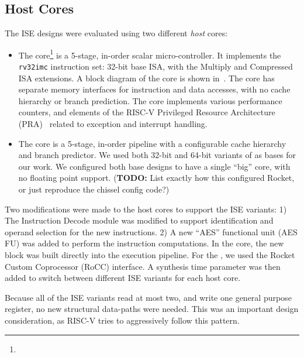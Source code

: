 
\subsection{Host Cores}

The ISE designs were evaluated using two different {\em host} cores:

\begin{itemize}
\item
    The  core\footnote{%
}   is a 5-stage, in-order scalar micro-controller.
    It implements the
    {\tt rv32imc}
    instruction set: 32-bit base ISA, with the Multiply and Compressed
    ISA extensions.
    A block diagram of the core is shown in~.
    The core has separate memory interfaces for instruction and data
    accesses, with no cache hierarchy or branch prediction.
    The core implements various performance counters,
    and
    elements of the
    RISC-V Privileged Resource Architecture 
    (PRA)~\cite[Chapter 3]{RV:ISA:II:17}
    related to exception and interrupt handling.

\item
    The  core\cite{rocket:16} 
    is a 5-stage, in-order pipeline with a configurable cache hierarchy and
    branch predictor.
    We used both 32-bit and 64-bit variants of  as bases for our work.
    We configured both base designs to have a single ``big'' core, with
    no floating point support.
    ({\bf TODO:} List exactly how this configured Rocket, or just
     reproduce the chissel config code?)

\end{itemize}

Two modifications were made to the host cores to support the ISE variants:
1) The Instruction Decode module was modified to support identification and
   operand selection for the new instructions. 
2) A new ``AES'' functional unit (AES FU) was added to perform the instruction
   computations.
In the  core, the new block was built directly into the execution
pipeline.
For the , we used the Rocket Custom Coprocessor (RoCC)
interface.
A synthesis time parameter was then added to switch between different
ISE variants for each host core.

Because all of the ISE variants read at most two,
and write one general purpose register, no new structural data-paths
were needed.
This was an important design consideration, as RISC-V tries to
aggressively follow this pattern.

